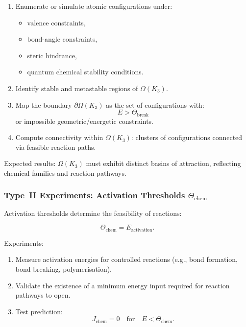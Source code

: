 \begin{enumerate}
    \item Enumerate or simulate atomic configurations under:
          \begin{itemize}
              \item valence constraints,
              \item bond-angle constraints,
              \item steric hindrance,
              \item quantum chemical stability conditions.
          \end{itemize}

    \item Identify stable and metastable regions of $\Omega(K_3)$.

    \item Map the boundary $\partial\Omega(K_3)$ as the set of configurations 
          with:
          \[
              E > \Theta_{\mathrm{break}}
          \]
          or impossible geometric/energetic constraints.

    \item Compute connectivity within $\Omega(K_3)$:
          clusters of configurations connected via feasible reaction paths.
\end{enumerate}

Expected results:  
$\Omega(K_3)$ must exhibit distinct basins of attraction, reflecting 
chemical families and reaction pathways.



\subsubsection{Type~II Experiments: Activation Thresholds $\Theta_{\mathrm{chem}}$}

Activation thresholds determine the feasibility of reactions:

\[
   \Theta_{\mathrm{chem}} = E_{\mathrm{activation}}.
\]

Experiments:

\begin{enumerate}
    \item Measure activation energies for controlled reactions (e.g., 
          bond formation, bond breaking, polymerisation).

    \item Validate the existence of a minimum energy input 
          required for reaction pathways to open.

    \item Test prediction:
          \[
             J_{\mathrm{chem}} = 0 
             \quad \text{for} \quad 
             E < \Theta_{\mathrm{chem}}.
          \]
\end{enumerate}

